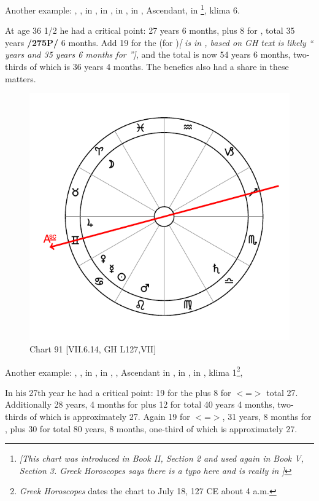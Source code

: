 Another example: \Sun, \Mars, \Venus\xspace in \Sagittarius, \Moon\xspace in \Libra, \Saturn\xspace in \Gemini, \Jupiter\xspace in \Virgo, Ascendant, \Mercury\xspace in \Capricorn \footnote{\textit{[This chart was introduced in Book II, Section 2 and used again in Book V, Section 3.  Greek Horoscopes says there is a typo here and \Mercury\xspace is really in \Scorpio]}}, klima 6. 

At age 36 1/2 he had a critical point: 27 years 6 months, plus 8 for \Venus, total 35 years \textbf{/275P/} 6 months. Add 19 for the \Sun\xspace (for \Gemini)\textit{[ \Sun\xspace is in \Sagittarius, based on GH text is likely ``\Sun\xspace 19 years and 35 years 6 months for \Sagittarius'']}, and the total is now 54 years 6 months, two-thirds of which is 36 years 4 months. The benefics also had a share in these matters. 

\newpage
\begin{figure}
\centering
\vspace{0pt}
\includegraphics[width=.68\textwidth]{charts/7_6_14}
\caption{Chart 91 [VII.6.14, GH L127,VII] }
\label{fig:chart91}
\end{figure} 

Another example: \Sun, \Mercury, \Venus\xspace in \Cancer, \Moon\xspace in \Aries, \Jupiter, Ascendant in \Gemini, \Saturn\xspace in \Libra, \Mars\xspace in \Leo, klima 1\footnote{\textit{Greek Horoscopes} dates the chart to July 18, 127 CE about 4 a.m.},

In his 27th year he had a critical point: 19 for the \Sun\xspace plus 8 for \Libra\xspace $<$=\Venus$>$ total 27. Additionally 28 years, 4 months for \Gemini\xspace plus 12 for \Jupiter\xspace total 40 years 4
months, two-thirds of which is approximately 27. Again 19 for \Leo\xspace $<$=\Sun$>$, 31 years, 8 months for \Cancer, plus 30 for \Saturn\xspace total 80 years, 8 months, one-third of which is approximately 27.

